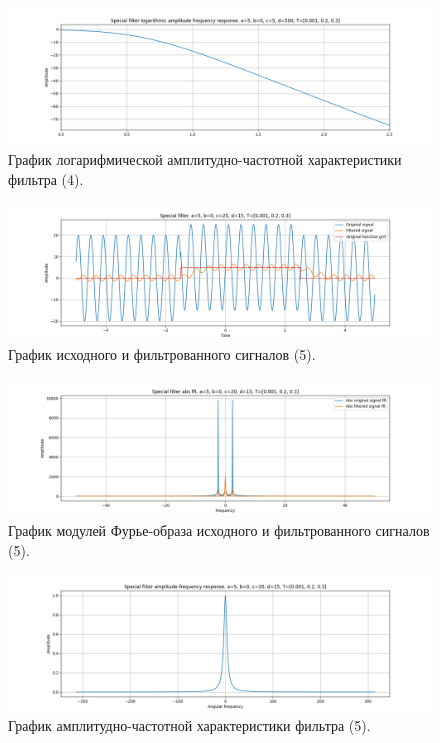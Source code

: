 \documentclass[a4paper, 12pt]{article}
\begin{document}
    \begin{figure}[H]
        \centering
        \includegraphics[scale=0.4]{4_fl2_lafr.png}
        \captionsetup{skip=0pt}
        \caption{График логарифмической амплитудно-частотной характеристики фильтра (4).}
        \label{fig:filinlafr24}
    \end{figure}
    \begin{figure}[H]
        \centering
        \includegraphics[scale=0.4]{5_fl2.png}
        \captionsetup{skip=0pt}
        \caption{График исходного и фильтрованного сигналов (5).}
        \label{fig:filin25}
    \end{figure}
    \begin{figure}[H]
        \centering
        \includegraphics[scale=0.4]{5_fl2_abs.png}
        \captionsetup{skip=0pt}
        \caption{График модулей Фурье-образа исходного и фильтрованного сигналов (5).}
        \label{fig:filinabs25}
    \end{figure}
    \begin{figure}[H]
        \centering
        \includegraphics[scale=0.4]{5_fl2_afr.png}
        \captionsetup{skip=0pt}
        \caption{График амплитудно-частотной характеристики фильтра (5).}
        \label{fig:filinafr25}
    \end{figure}
\end{document}
